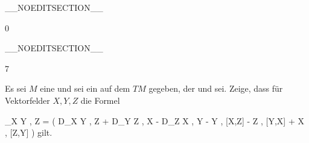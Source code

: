 {

}
{  }

__NOEDITSECTION__

{0}

{

}
{  }

__NOEDITSECTION__

{7}

{

Es sei $M$ eine
und sei ein
auf dem
$TM$ gegeben, der
und
sei. Zeige, dass für Vektorfelder $X,Y,Z$ die Formel

\mavergleichskettedisp
{\vergleichskette
{ \left\langle \nabla_X Y , Z  \right\rangle
}
{ =} { {  }  \left(  D_X \left\langle  Y  ,  Z  \right\rangle +  D_Y \left\langle  Z  ,  X  \right\rangle -  D_Z \left\langle  X  ,  Y  \right\rangle  - \left\langle  Y  , [X,Z]   \right\rangle - \left\langle  Z  , [Y,X]   \right\rangle + \left\langle  X  , [Z,Y]   \right\rangle   \right)
}
{ } {
}
{ } {
}
{ } {
}
}
{}{}{}
gilt.

}
